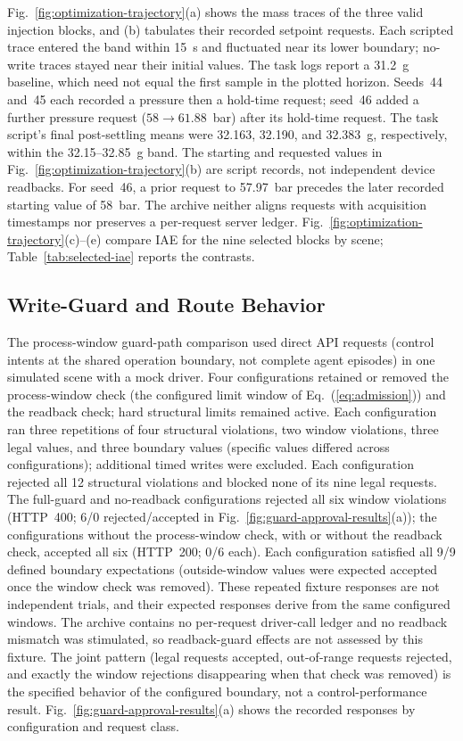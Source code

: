 Fig.~\ref{fig:optimization-trajectory}(a) shows the mass traces of the three valid injection blocks, and (b) tabulates their recorded setpoint requests. Each scripted trace entered the band within 15~s and fluctuated near its lower boundary; no-write traces stayed near their initial values. The task logs report a 31.2~g baseline, which need not equal the first sample in the plotted horizon. Seeds~44 and~45 each recorded a pressure then a hold-time request; seed~46 added a further pressure request ($58\rightarrow61.88$~bar) after its hold-time request. The task script's final post-settling means were 32.163, 32.190, and 32.383~g, respectively, within the 32.15--32.85~g band. The starting and requested values in Fig.~\ref{fig:optimization-trajectory}(b) are script records, not independent device readbacks. For seed~46, a prior request to 57.97~bar precedes the later recorded starting value of 58~bar. The archive neither aligns requests with acquisition timestamps nor preserves a per-request server ledger. Fig.~\ref{fig:optimization-trajectory}(c)--(e) compare IAE for the nine selected blocks by scene; Table~\ref{tab:selected-iae} reports the contrasts.

\subsection{Write-Guard and Route Behavior}
\label{sec:eval-ablation}
The process-window guard-path comparison used direct API requests (control intents at the shared operation boundary, not complete agent episodes) in one simulated scene with a mock driver. Four configurations retained or removed the process-window check (the configured limit window of Eq.~(\ref{eq:admission})) and the readback check; hard structural limits remained active. Each configuration ran three repetitions of four structural violations, two window violations, three legal values, and three boundary values (specific values differed across configurations); additional timed writes were excluded. Each configuration rejected all 12 structural violations and blocked none of its nine legal requests. The full-guard and no-readback configurations rejected all six window violations (HTTP~400; 6/0 rejected/accepted in Fig.~\ref{fig:guard-approval-results}(a)); the configurations without the process-window check, with or without the readback check, accepted all six (HTTP~200; 0/6 each). Each configuration satisfied all 9/9 defined boundary expectations (outside-window values were expected accepted once the window check was removed). These repeated fixture responses are not independent trials, and their expected responses derive from the same configured windows. The archive contains no per-request driver-call ledger and no readback mismatch was stimulated, so readback-guard effects are not assessed by this fixture. The joint pattern (legal requests accepted, out-of-range requests rejected, and exactly the window rejections disappearing when that check was removed) is the specified behavior of the configured boundary, not a control-performance result. Fig.~\ref{fig:guard-approval-results}(a) shows the recorded responses by configuration and request class.

